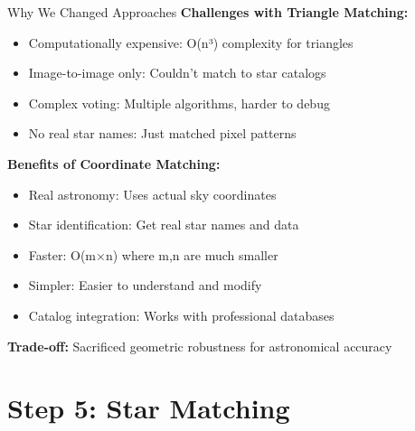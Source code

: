 \documentclass[aspectratio=169]{beamer}
\begin{document}
\begin{frame}{Why We Changed Approaches}
\textbf{Challenges with Triangle Matching:}
\begin{itemize}
\item \textcolor{starred}{Computationally expensive:} O(n³) complexity for triangles
\item \textcolor{starred}{Image-to-image only:} Couldn't match to star catalogs
\item \textcolor{starred}{Complex voting:} Multiple algorithms, harder to debug
\item \textcolor{starred}{No real star names:} Just matched pixel patterns
\end{itemize}

\textbf{Benefits of Coordinate Matching:}
\begin{itemize}
\item \textcolor{stargreen}{Real astronomy:} Uses actual sky coordinates
\item \textcolor{stargreen}{Star identification:} Get real star names and data
\item \textcolor{stargreen}{Faster:} O(m×n) where m,n are much smaller
\item \textcolor{stargreen}{Simpler:} Easier to understand and modify
\item \textcolor{stargreen}{Catalog integration:} Works with professional databases
\end{itemize}

\vspace{0.5cm}
\begin{center}
\textbf{Trade-off:} Sacrificed geometric robustness for astronomical accuracy
\end{center}
\end{frame}

\section{Step 5: Star Matching}
\end{document}
